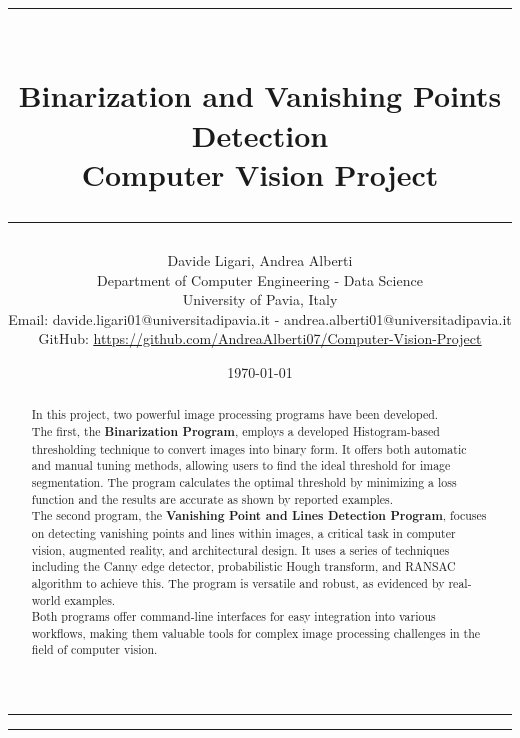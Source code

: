 \documentclass{class}
\title{
    \rule{\textwidth}{0.3pt}\vspace{0.3cm}\\
    \textbf{Binarization and Vanishing Points Detection}\vspace{0.2cm}\\
    \large{Computer Vision Project}
    \rule{\textwidth}{0.3pt}\vspace{0.5cm}}
\author{Davide Ligari, Andrea Alberti\vspace{0.2cm}\\
    \small Department of Computer Engineering - Data Science\\
    \small University of Pavia, Italy \\
    \small Email: davide.ligari01@universitadipavia.it - andrea.alberti01@universitadipavia.it \\
    \small GitHub: \href{https://github.com/AndreaAlberti07/Computer-Vision-Project}{\underline{https://github.com/AndreaAlberti07/Computer-Vision-Project}}
    \vspace{0.5cm}}
\date{\today}
\begin{document}
\begin{titlepage}

    \maketitle
    \thispagestyle{empty}

    \begin{multicols*}{2}

        \hrule
        \begin{abstract}
            \noindent
            In this project, two powerful image processing programs have been developed.\\
            The first, the \textbf{Binarization Program}, employs a developed Histogram-based thresholding technique to
            convert images into binary form. It offers both automatic and manual tuning methods, allowing users to find
            the ideal threshold for image segmentation. The program calculates the optimal threshold by minimizing a loss
            function and the results are accurate as shown by reported examples.\\
            The second program, the \textbf{Vanishing Point and Lines Detection Program}, focuses on detecting vanishing
            points and lines within images, a critical task in computer vision, augmented reality, and architectural design.
            It uses a series of techniques including the Canny edge detector, probabilistic Hough transform, and RANSAC
            algorithm to achieve this. The program is versatile and robust, as evidenced by real-world examples.\\
            Both programs offer command-line interfaces for easy integration into various workflows,
            making them valuable tools for complex image processing challenges in the field of computer vision.
            \\
        \end{abstract}
        \newcolumn
        \hrule
        \tableofcontents
    \end{multicols*}
\end{titlepage}

\clearpage
\pagestyle{FirstPage}

\clearpage

\end{document}
